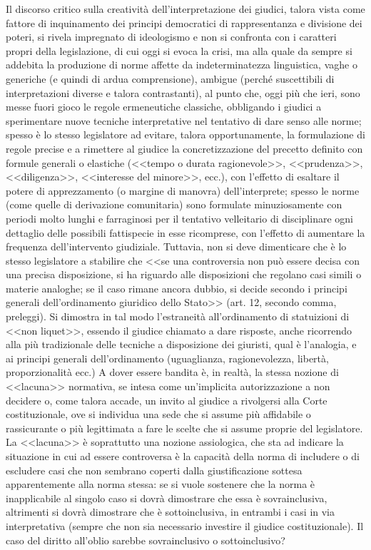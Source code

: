 Il discorso critico sulla creatività dell'interpretazione dei giudici, talora vista come fattore di inquinamento dei principi democratici di rappresentanza e divisione dei poteri, si rivela impregnato di ideologismo e non si confronta con i caratteri propri della legislazione, di cui oggi si evoca la crisi, ma alla quale da sempre si addebita la produzione di norme affette da indeterminatezza linguistica, vaghe o generiche (e quindi di ardua comprensione), ambigue (perché suscettibili di interpretazioni diverse e talora contrastanti), al punto che, oggi più che ieri, sono messe fuori gioco le regole ermeneutiche classiche, obbligando i giudici a sperimentare nuove tecniche interpretative nel tentativo di dare senso alle norme; spesso è lo stesso legislatore ad evitare, talora opportunamente, la formulazione di regole precise e a rimettere al giudice la concretizzazione del precetto definito con formule generali o elastiche (<<tempo o durata
ragionevole>>, <<prudenza>>, <<diligenza>>, <<interesse del minore>>, ecc.), con l'effetto di esaltare il potere di apprezzamento (o margine di manovra) dell'interprete; spesso le norme (come quelle di derivazione comunitaria) sono formulate minuziosamente con periodi molto lunghi e farraginosi per il tentativo velleitario di disciplinare ogni dettaglio delle possibili fattispecie in esse ricomprese, con l'effetto di aumentare la frequenza dell'intervento giudiziale. Tuttavia, non si deve dimenticare che è lo stesso legislatore a stabilire che <<se una controversia non può essere decisa con una precisa disposizione, si ha riguardo alle disposizioni che regolano casi simili o materie analoghe; se il caso rimane ancora dubbio, si decide secondo i principi generali dell'ordinamento giuridico dello Stato>> (art. 12, secondo comma, preleggi). Si dimostra in tal modo l'estraneità all'ordinamento di statuizioni di <<non liquet>>, essendo il giudice chiamato a dare risposte, anche ricorrendo alla più tradizionale delle tecniche a disposizione dei giuristi, qual è l'analogia, e ai principi generali dell'ordinamento (uguaglianza, ragionevolezza, libertà, proporzionalità ecc.) A dover essere bandita è, in realtà, la stessa nozione di <<lacuna>> normativa, se intesa come un'implicita autorizzazione a non decidere o, come talora accade, un invito al giudice a rivolgersi alla Corte costituzionale, ove si individua una sede che si assume più affidabile o rassicurante o più legittimata a fare le scelte che si assume proprie del legislatore. La <<lacuna>> è soprattutto una nozione assiologica, che sta ad indicare la situazione in cui ad essere controversa è la capacità della norma di includere o di escludere casi che non sembrano coperti dalla giustificazione sottesa apparentemente alla norma stessa: se si vuole sostenere che la norma è inapplicabile al singolo caso si dovrà dimostrare che essa è sovrainclusiva, altrimenti si dovrà dimostrare che è sottoinclusiva, in entrambi i casi in via interpretativa (sempre che non sia necessario investire il giudice costituzionale). Il caso del diritto all'oblio sarebbe sovrainclusivo o sottoinclusivo? 


